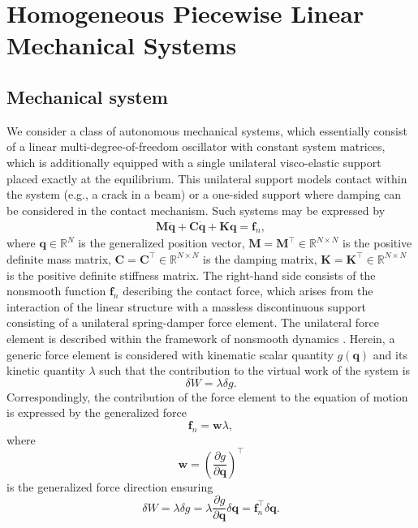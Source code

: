 \documentclass[a4paper,9pt,parskip=half,english]{article}
\theoremstyle{plain}
\theoremstyle{definition}
\newcommand{\pd}[2]{\frac{\partial #1}{\partial #2}}
\newcommand{\T}{^{\!\top}} %
\newcommand{\vf}{\mathbf f}
\newcommand{\vq}{\mathbf q}
\newcommand{\vw}{\mathbf w}
\newcommand{\vC}{\mathbf C}
\newcommand{\vK}{\mathbf K}
\newcommand{\vM}{\mathbf M}
\begin{document}
\section{Homogeneous Piecewise Linear Mechanical Systems}\label{section:background}
\subsection{Mechanical system}
We consider a class of autonomous mechanical systems, which essentially consist of a linear multi-degree-of-freedom oscillator with constant system matrices, which is additionally equipped with a single unilateral visco-elastic support placed exactly at the equilibrium. This unilateral support models contact within the system (e.g., a crack in a beam) or a one-sided support where damping can be considered in the contact mechanism. Such systems may be expressed by
\begin{align}\label{eq:eom_2ndorder}
	\vM \ddot{\vq} + \vC \dot{\vq} + \vK \vq = \vf_n,
\end{align}
where $\vq \in \mathbb{R}^N$ is the generalized position vector, $\vM=\vM\T \in \mathbb{R}^{N \times N}$ is the positive definite mass matrix, $\vC=\vC\T \in \mathbb{R}^{N \times N}$ is the damping matrix, $\vK=\vK\T \in \mathbb{R}^{N \times N}$ is the positive definite stiffness matrix. The right-hand side consists of the nonsmooth function $\vf_n$ describing the  contact force, which arises from the interaction of the linear structure with a massless discontinuous support consisting of a unilateral spring-damper force element. The unilateral force element is described within the framework of nonsmooth dynamics \cite{Glocker2001}. Herein, a generic force element is considered with kinematic scalar quantity $g(\vq)$ and its kinetic quantity $\lambda$ such that the contribution to the virtual work of the system is 
\begin{equation}
	\delta W = \lambda \delta g.
\end{equation}
Correspondingly, the contribution of the force element to the equation of motion is expressed by the generalized force 
\begin{equation}
		\vf_n = \vw \lambda, 
\end{equation}
where 
\begin{equation}
	\vw = (\pd{g}{\vq})\T
\end{equation}
is the generalized force direction ensuring 
\begin{equation}
	\delta W = \lambda \delta g = \lambda \pd{g}{\vq} \delta \vq = \vf_n\T \delta \vq.
\end{equation}
\end{document}
